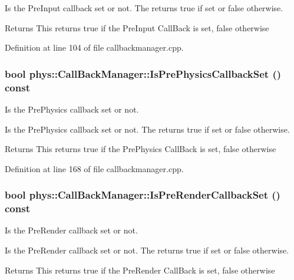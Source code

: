 Is the PreInput callback set or not. The returns true if set or false otherwise. \begin{DoxyReturn}{Returns}
This returns true if the PreInput CallBack is set, false otherwise 
\end{DoxyReturn}


Definition at line 104 of file callbackmanager.cpp.

\hypertarget{classphys_1_1CallBackManager_a8684425c42a4416a204852ce6a246dc6}{
\subsubsection[{IsPrePhysicsCallbackSet}]{\setlength{\rightskip}{0pt plus 5cm}bool phys::CallBackManager::IsPrePhysicsCallbackSet () const}}
\label{d1/d47/classphys_1_1CallBackManager_a8684425c42a4416a204852ce6a246dc6}


Is the PrePhysics callback set or not. 

Is the PrePhysics callback set or not. The returns true if set or false otherwise. \begin{DoxyReturn}{Returns}
This returns true if the PrePhysics CallBack is set, false otherwise 
\end{DoxyReturn}


Definition at line 168 of file callbackmanager.cpp.

\hypertarget{classphys_1_1CallBackManager_a91017cc0aa4a04e74fd8f9ca0895b6f8}{
\subsubsection[{IsPreRenderCallbackSet}]{\setlength{\rightskip}{0pt plus 5cm}bool phys::CallBackManager::IsPreRenderCallbackSet () const}}
\label{d1/d47/classphys_1_1CallBackManager_a91017cc0aa4a04e74fd8f9ca0895b6f8}


Is the PreRender callback set or not. 

Is the PreRender callback set or not. The returns true if set or false otherwise. \begin{DoxyReturn}{Returns}
This returns true if the PreRender CallBack is set, false otherwise 
\end{DoxyReturn}



